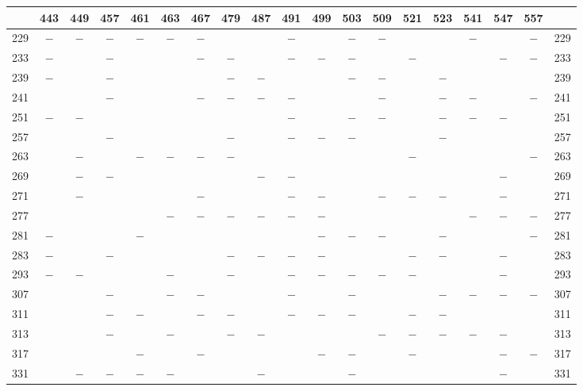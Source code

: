 \begin{center}\begingroup\fontsize{8}{10.5}\selectfont\setlength{\tabcolsep}{2pt}
\begin{tabular}{r|c|c|c|c|c|c|c|c|c|c|c|c|c|c|c|c|c|r}
\hline
 & 443 & 449 & 457 & 461 & 463 & 467 & 479 & 487 & 491 & 499 & 503 & 509 & 521 & 523 & 541 & 547 & 557 & \\
\hline
229 & $-$ & $-$ & $-$ & $-$ & $-$ & $-$ &  &  & $-$ &  & $-$ & $-$ &  &  & $-$ &  & $-$ & 229\\
233 & $-$ &  & $-$ &  &  & $-$ & $-$ &  & $-$ & $-$ & $-$ &  & $-$ &  &  & $-$ & $-$ & 233\\
239 & $-$ &  & $-$ &  &  &  & $-$ & $-$ &  &  & $-$ & $-$ &  & $-$ &  &  &  & 239\\
241 &  &  & $-$ &  &  & $-$ & $-$ & $-$ & $-$ &  &  & $-$ &  & $-$ & $-$ &  & $-$ & 241\\
251 & $-$ & $-$ &  &  &  &  &  &  & $-$ &  & $-$ & $-$ &  & $-$ & $-$ & $-$ &  & 251\\
257 &  &  & $-$ &  &  &  & $-$ &  & $-$ & $-$ & $-$ &  &  & $-$ &  &  &  & 257\\
263 &  & $-$ &  & $-$ & $-$ & $-$ & $-$ &  &  &  &  &  & $-$ &  &  &  & $-$ & 263\\
269 &  & $-$ & $-$ &  &  &  &  & $-$ & $-$ &  &  &  &  &  &  & $-$ &  & 269\\
271 &  & $-$ &  &  &  & $-$ &  &  & $-$ & $-$ &  & $-$ & $-$ & $-$ &  & $-$ &  & 271\\
277 &  &  &  &  & $-$ & $-$ & $-$ & $-$ & $-$ & $-$ &  &  &  &  & $-$ & $-$ & $-$ & 277\\
281 & $-$ &  &  & $-$ &  &  &  &  &  & $-$ & $-$ & $-$ &  & $-$ &  &  & $-$ & 281\\
283 & $-$ &  & $-$ &  &  &  & $-$ & $-$ & $-$ & $-$ &  &  & $-$ & $-$ &  & $-$ &  & 283\\
293 & $-$ & $-$ &  &  & $-$ &  & $-$ &  & $-$ & $-$ & $-$ & $-$ & $-$ &  &  & $-$ &  & 293\\
307 &  &  & $-$ &  & $-$ & $-$ &  &  & $-$ &  & $-$ &  &  & $-$ & $-$ & $-$ & $-$ & 307\\
311 &  &  & $-$ & $-$ &  & $-$ & $-$ &  & $-$ & $-$ & $-$ &  & $-$ & $-$ &  &  &  & 311\\
313 &  &  & $-$ &  & $-$ &  & $-$ & $-$ &  &  &  & $-$ & $-$ & $-$ & $-$ & $-$ &  & 313\\
317 &  &  &  & $-$ &  & $-$ &  &  &  & $-$ & $-$ &  & $-$ &  &  & $-$ & $-$ & 317\\
331 &  & $-$ & $-$ & $-$ & $-$ &  &  & $-$ &  &  & $-$ &  &  &  &  & $-$ &  & 331\\

\end{tabular}
\end{center}
